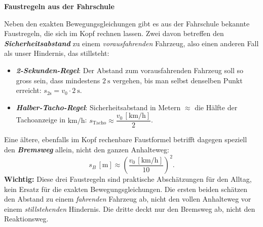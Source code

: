 \documentclass[addpoints,11pt,a4paper]{exam}
\newenvironment{theoriebox}[1][Theorie]{%
  \par\addvspace{10pt}\noindent\textbf{#1}\par\smallskip\noindent
}{%
  \par\addvspace{10pt}
}
\newlength{\antwortraumlen}
\newcommand{\Antwortraum}[1]{%
  \pgfmathsetlength{\antwortraumlen}{#1*2.5cm}%
  \begin{answerbox}
    \rule{0pt}{\antwortraumlen}%
  \end{answerbox}%
}
\begin{document}
\begin{questions}
\begin{taskbox}
\end{taskbox}
\end{questions}

\begin{theoriebox}[Faustregeln aus der Fahrschule]
Neben den exakten Bewegungsgleichungen gibt es aus der Fahrschule
bekannte Faustregeln, die sich im Kopf rechnen lassen. Zwei davon
betreffen den \textbf{\emph{Sicherheitsabstand}} zu einem
\emph{vorausfahrenden} Fahrzeug, also einen anderen Fall als unser
Hindernis, das stillsteht:
\begin{itemize}[leftmargin=1.2cm,itemsep=0.25em]
  \item \textbf{\emph{2-Sekunden-Regel}}: Der Abstand zum
  vorausfahrenden Fahrzeug soll so gross sein, dass mindestens
  $\SI{2}{\second}$ vergehen, bis man selbst denselben Punkt erreicht:
  $s_{2\text{s}} = v_0\cdot\SI{2}{\second}$.
  \item \textbf{\emph{Halber-Tacho-Regel}}: Sicherheitsabstand in
  Metern $\approx$ die Hälfte der Tachoanzeige in
  $\si{\kilo\meter\per\hour}$: $s_{\text{Tacho}}
  \approx \dfrac{v_0\,[\si{\kilo\meter\per\hour}]}{2}$.
\end{itemize}
Eine ältere, ebenfalls im Kopf rechenbare Faustformel betrifft dagegen
speziell den \textbf{\emph{Bremsweg}} allein, nicht den ganzen
Anhalteweg:
\[
  s_B\,[\text{m}] \approx \left(\frac{v_0\,[\si{\kilo\meter\per\hour}]}{10}\right)^{\!2}.
\]
\textbf{Wichtig:} Diese drei Faustregeln sind praktische Abschätzungen
für den Alltag, kein Ersatz für die exakten Bewegungsgleichungen. Die
ersten beiden schätzen den Abstand zu einem \emph{fahrenden} Fahrzeug
ab, nicht den vollen Anhalteweg vor einem \emph{stillstehenden}
Hindernis. Die dritte deckt nur den Bremsweg ab, nicht den
Reaktionsweg.
\end{theoriebox}
\end{document}
